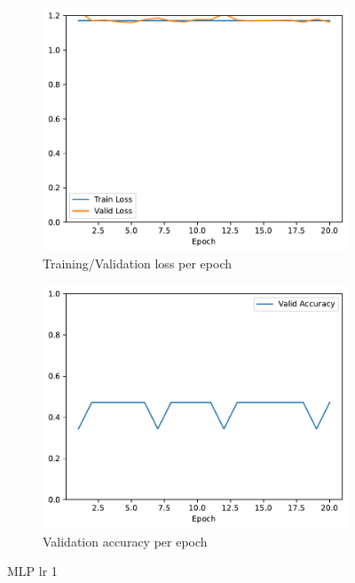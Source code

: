 \documentclass[11pt]{article}
\begin{document}
\begin{figure}[h!]
\centering
\begin{subfigure}{.5\textwidth}
  \centering
  \includegraphics[width=.9\linewidth]{plots/mlp-training-loss-batch-16-lr-1.0-epochs-20-hidden-200-dropout-0-l2-0-layers-1-act-relu-opt-sgd}
  \caption{Training/Validation loss per epoch}
\end{subfigure}%
\begin{subfigure}{.5\textwidth}
  \centering
  \includegraphics[width=.9\linewidth]{plots/mlp-validation-accuracy-batch-16-lr-1.0-epochs-20-hidden-200-dropout-0-l2-0-layers-1-act-relu-opt-sgd}
  \caption{Validation accuracy per epoch}
\end{subfigure}
\caption{MLP lr 1}
\label{fig:MLP_lr_1}
\end{figure}
\end{document}
